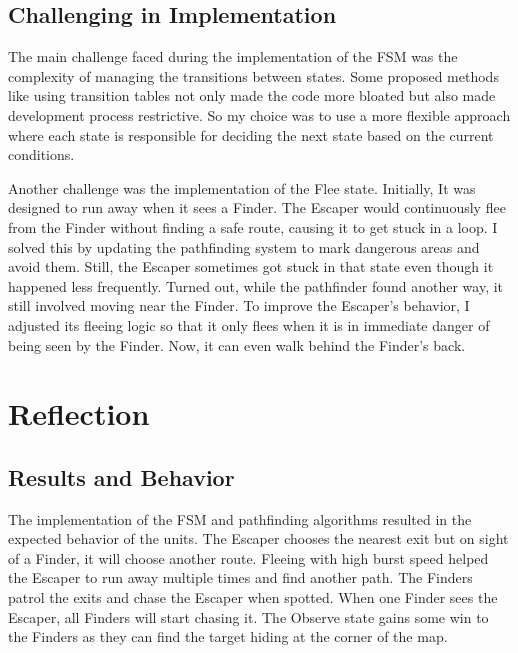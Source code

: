 \documentclass[a4paper,12pt]{article}
\begin{document}
\subsection{Challenging in Implementation}
The main challenge faced during the implementation of the FSM was the complexity of managing the transitions between states.
Some proposed methods like using transition tables not only made the code more bloated but also made development process restrictive.
So my choice was to use a more flexible approach where each state is responsible for deciding the next state based on the current conditions.

Another challenge was the implementation of the Flee state. 
Initially, It was designed to run away when it sees a Finder.
The Escaper would continuously flee from the Finder without finding a safe route, causing it to get stuck in a loop. I solved this by updating the pathfinding system to mark dangerous areas and avoid them.
Still, the Escaper sometimes got stuck in that state even though it happened less frequently.
Turned out, while the pathfinder found another way, it still involved moving near the Finder.
To improve the Escaper's behavior, I adjusted its fleeing logic so that it only flees when it is in immediate danger of being seen by the Finder.
Now, it can even walk behind the Finder's back.



\section{Reflection}
\subsection{Results and Behavior}
The implementation of the FSM and pathfinding algorithms resulted in the expected behavior of the units.
The Escaper chooses the nearest exit but on sight of a Finder, it will choose another route.
Fleeing with high burst speed helped the Escaper to run away multiple times and find another path.
The Finders patrol the exits and chase the Escaper when spotted.
When one Finder sees the Escaper, all Finders will start chasing it.
The Observe state gains some win to the Finders as they can find the target hiding at the corner of the map.
\end{document}
